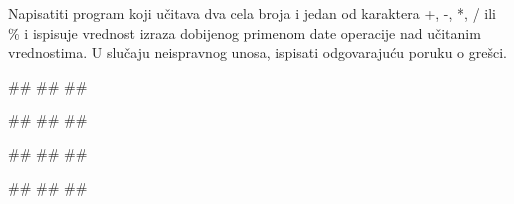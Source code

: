\begin{Exercise}[label=KT_NG_25] 
Napisatiti program koji učitava dva cela broja i jedan od karaktera +, -, *, / ili \% i ispisuje vrednost izraza 
dobijenog primenom date operacije nad učitanim vrednostima.
U slučaju neispravnog unosa, ispisati odgovarajuću poruku o grešci. 

 \begin{miditest}
\begin{upotreba}{1}
#\naslovInt#
##
##
\end{upotreba}
\end{miditest}
\begin{miditest}
\begin{upotreba}{2}
#\naslovInt#
##
##
\end{upotreba}
\end{miditest}

\begin{miditest}
\begin{upotreba}{3}
#\naslovInt#
##
##
\end{upotreba}
\end{miditest}
\begin{miditest}
\begin{upotreba}{4}
#\naslovInt#
##
##
\end{upotreba}
\end{miditest}

\end{Exercise}
\ifresenja
 \begin{Answer}[ref=KT_NG_25]
\end{Answer}
\fi


